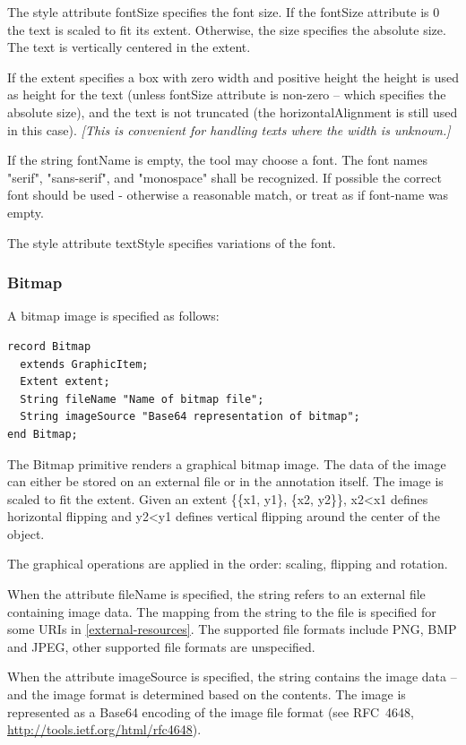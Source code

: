 \documentclass[10pt,a4paper]{report}
\def\doublelabel#1{\label{#1}}
\begin{document}
The style attribute fontSize specifies the font size. If the fontSize
attribute is 0 the text is scaled to fit its extent. Otherwise, the size
specifies the absolute size. The text is vertically centered in the
extent.

If the extent specifies a box with zero width and positive height the
height is used as height for the text (unless fontSize attribute is
non-zero -- which specifies the absolute size), and the text is not
truncated (the horizontalAlignment is still used in this case).
\emph{{[}This is convenient for handling texts where the width is
unknown.{]}}

If the string fontName is empty, the tool may choose a font. The font
names "serif", "sans-serif", and "monospace" shall be recognized. If
possible the correct font should be used - otherwise a reasonable match,
or treat as if font-name was empty.

The style attribute textStyle specifies variations of the font.

\subsubsection{Bitmap}\doublelabel{bitmap}

A bitmap image is specified as follows:

\begin{lstlisting}[language=modelica]
record Bitmap
  extends GraphicItem;
  Extent extent;
  String fileName "Name of bitmap file";
  String imageSource "Base64 representation of bitmap";
end Bitmap;
\end{lstlisting}
The Bitmap primitive renders a graphical bitmap image. The data of the
image can either be stored on an external file or in the annotation
itself. The image is scaled to fit the extent. Given an extent \{\{x1,
y1\}, \{x2, y2\}\}, x2\textless{}x1 defines horizontal flipping and
y2\textless{}y1 defines vertical flipping around the center of the
object.

The graphical operations are applied in the order: scaling, flipping and
rotation.

When the attribute fileName is specified, the string refers to an
external file containing image data. The mapping from the string to the
file is specified for some URIs in \ref{external-resources}. The supported file
formats include PNG, BMP and JPEG, other supported file formats are
unspecified.

When the attribute imageSource is specified, the string contains the
image data -- and the image format is determined based on the contents.
The image is represented as a Base64 encoding of the image file format
(see RFC~4648, \url{http://tools.ietf.org/html/rfc4648}).
\end{document}

